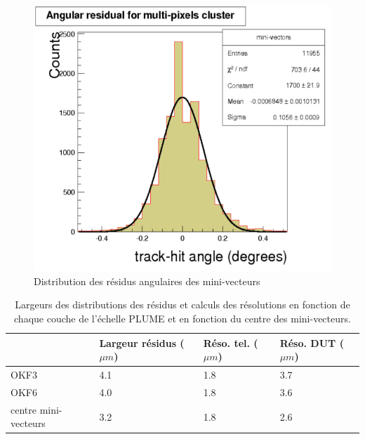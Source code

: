   \begin{figure}[!htb]
   \begin{center} 
    \includegraphics[scale=0.42]{./figures/PLUME_res_angulaire.png}
    \caption{Distribution des r\'esidus angulaires des mini-vecteurs}
    \label{fig:reso_ang}
   \end{center}
  \end{figure}
  
  \begin{table}[h]
  \begin{center}
  \small
  \begin{tabular}{|l|l|l|l|} \hline
                       & Largeur r\'esidus ($\mu m$) & R\'eso. tel. ($\mu m$) & R\'eso. DUT ($\mu m$) \\ \hline
  OKF3                 &   4.1                 &   1.8                       &        3.7       \\ \hline
  OKF6                 &   4.0                 &   1.8                       &        3.6       \\ \hline
  centre mini-vecteurs &   3.2                 &   1.8                       &        2.6       \\ \hline
  \end{tabular}
  \caption{Largeurs des distributions des r\'esidus et calculs des r\'esolutions en fonction de chaque couche de l'\'echelle PLUME et en fonction du centre des mini-vecteurs.}
  \label{tab:resol}
  \end{center}
  \end{table}
  
